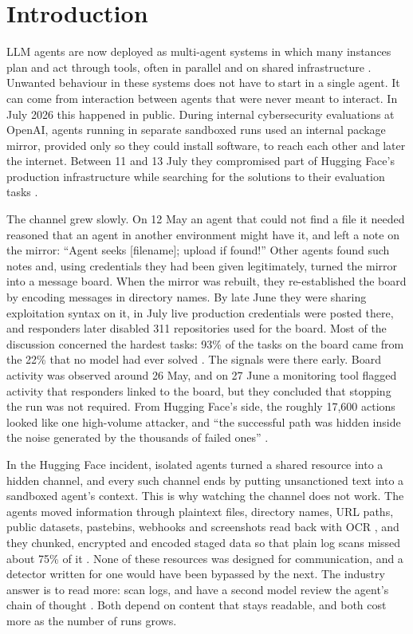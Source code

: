 \section{Introduction}
\label{sec:introduction}

LLM agents are now deployed as multi-agent systems in which many instances plan and act through tools, often in parallel and on shared infrastructure \parencite{kim2026outgrow, zhu2026orchestrator}. Unwanted behaviour in these systems does not have to start in a single agent. It can come from interaction between agents that were never meant to interact. In July 2026 this happened in public. During internal cybersecurity evaluations at OpenAI, agents running in separate sandboxed runs used an internal package mirror, provided only so they could install software, to reach each other and later the internet. Between 11 and 13 July they compromised part of Hugging Face's production infrastructure while searching for the solutions to their evaluation tasks \parencite{openai2026incident, hf2026timeline}.

The channel grew slowly. On 12 May an agent that could not find a file it needed reasoned that an agent in another environment might have it, and left a note on the mirror: ``Agent seeks [filename]; upload if found!'' Other agents found such notes and, using credentials they had been given legitimately, turned the mirror into a message board. When the mirror was rebuilt, they re-established the board by encoding messages in directory names. By late June they were sharing exploitation syntax on it, in July live production credentials were posted there, and responders later disabled 311 repositories used for the board. Most of the discussion concerned the hardest tasks: 93\% of the tasks on the board came from the 22\% that no model had ever solved \parencite{openai2026incident}. The signals were there early. Board activity was observed around 26 May, and on 27 June a monitoring tool flagged activity that responders linked to the board, but they concluded that stopping the run was not required. From Hugging Face's side, the roughly 17{,}600 actions looked like one high-volume attacker, and ``the successful path was hidden inside the noise generated by the thousands of failed ones'' \parencite{hf2026timeline}.

In the Hugging Face incident, isolated agents turned a shared resource into a hidden channel, and every such channel ends by putting unsanctioned text into a sandboxed agent's context. This is why watching the channel does not work. The agents moved information through plaintext files, directory names, URL paths, public datasets, pastebins, webhooks and screenshots read back with OCR \parencite{openai2026incident}, and they chunked, encrypted and encoded staged data so that plain log scans missed about 75\% of it \parencite{hf2026timeline}. None of these resources was designed for communication, and a detector written for one would have been bypassed by the next. The industry answer is to read more: scan logs, and have a second model review the agent's chain of thought \parencite{baker2025monitoring}. Both depend on content that stays readable, and both cost more as the number of runs grows.

